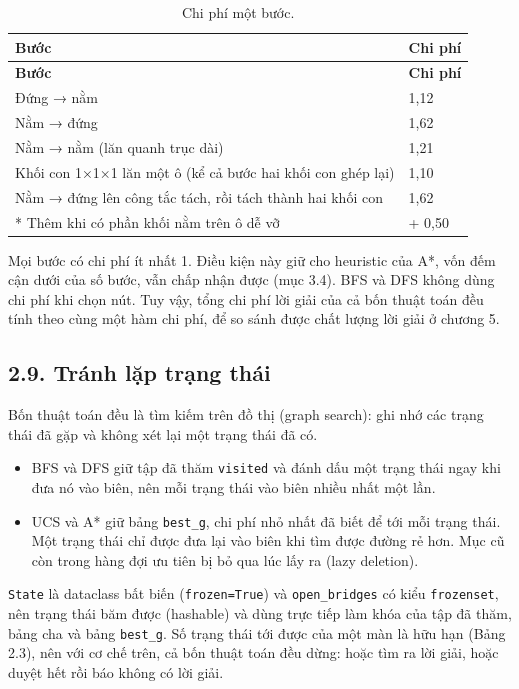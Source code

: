 \begin{longtable}[]{@{}ll@{}}
\caption{ Chi phí một bước.}\tabularnewline
\toprule\noalign{}
\rowcolor{tablehead}\textbf{Bước} & \textbf{Chi phí} \\
\midrule\noalign{}
\endfirsthead
\toprule\noalign{}
\rowcolor{tablehead}\textbf{Bước} & \textbf{Chi phí} \\
\midrule\noalign{}
\endhead
\bottomrule\noalign{}
\endlastfoot
Đứng → nằm & 1,12 \\
Nằm → đứng & 1,62 \\
Nằm → nằm (lăn quanh trục dài) & 1,21 \\
Khối con 1×1×1 lăn một ô (kể cả bước hai khối con ghép lại) & 1,10 \\
Nằm → đứng lên công tắc tách, rồi tách thành hai khối con & 1,62 \\*
Thêm khi có phần khối nằm trên ô dễ vỡ & + 0,50 \\
\end{longtable}

Mọi bước có chi phí ít nhất 1. Điều kiện này giữ cho heuristic của A*, vốn đếm cận dưới của số bước, vẫn chấp nhận được (mục 3.4). BFS và DFS không dùng chi phí khi chọn nút. Tuy vậy, tổng chi phí lời giải của cả bốn thuật toán đều tính theo cùng một hàm chi phí, để so sánh được chất lượng lời giải ở chương 5.

\subsection{2.9. Tránh lặp trạng thái}

Bốn thuật toán đều là tìm kiếm trên đồ thị (graph search): ghi nhớ các trạng thái đã gặp và không xét lại một trạng thái đã có.

\begin{itemize}
\tightlist
\item
  BFS và DFS giữ tập đã thăm \texttt{visited} và đánh dấu một trạng thái ngay khi đưa nó vào biên, nên mỗi trạng thái vào biên nhiều nhất một lần.
\item
  UCS và A* giữ bảng \texttt{best\_\allowbreak{}g}, chi phí nhỏ nhất đã biết để tới mỗi trạng thái. Một trạng thái chỉ được đưa lại vào biên khi tìm được đường rẻ hơn. Mục cũ còn trong hàng đợi ưu tiên bị bỏ qua lúc lấy ra (lazy deletion).
\end{itemize}

\texttt{State} là dataclass bất biến (\texttt{frozen=True}) và \texttt{open\_\allowbreak{}bridges} có kiểu \texttt{frozenset}, nên trạng thái băm được (hashable) và dùng trực tiếp làm khóa của tập đã thăm, bảng cha và bảng \texttt{best\_\allowbreak{}g}. Số trạng thái tới được của một màn là hữu hạn (Bảng 2.3), nên với cơ chế trên, cả bốn thuật toán đều dừng: hoặc tìm ra lời giải, hoặc duyệt hết rồi báo không có lời giải.

